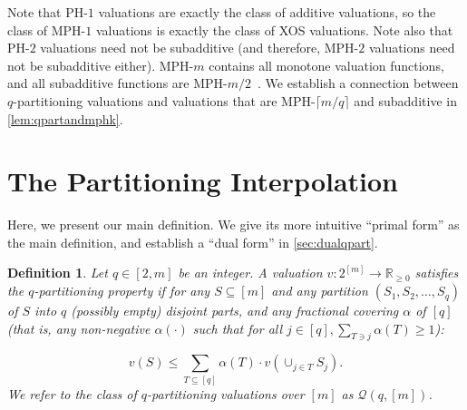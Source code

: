 \documentclass[11pt]{article}%
\newtheorem{definition}[theorem]{Definition}
\numberwithin{theorem}{subsection}
\begin{document}
Note that PH-$1$ valuations are exactly the class of additive valuations, so the class of MPH-$1$ valuations is exactly the class of XOS valuations. Note also that PH-$2$ valuations need not be subadditive (and therefore, MPH-$2$ valuations need not be subadditive either). MPH-$m$ contains all monotone valuation functions, and all subadditive functions are MPH-$m/2$~\cite{EzraFNTW19}. We establish a connection between $q$-partitioning valuations and valuations that are MPH-$\lceil m/q\rceil$ and subadditive in \cref{lem:qpartandmphk}.





\section{The Partitioning Interpolation}\label{sec:defineqpart}
Here, we present our main definition. We give its more intuitive ``primal form'' as the main definition, and establish a ``dual form'' in \cref{sec:dualqpart}.

\begin{definition}
\label{def:qpartprimal}
Let $q \in [2,m]$ be an integer. A valuation $v:2^{[m]}\longrightarrow \mathbb{R}_{\ge 0}$ satisfies the $q$-partitioning property if for any $S\subseteq [m]$ and any partition $(S_1, S_2, \ldots, S_q)$ of $S$ into $q$ (possibly empty) disjoint parts, and any fractional covering $\alpha$ of $[q]$ (that is, any non-negative $\alpha(\cdot)$ such that for all $j \in [q], \sum_{T \ni j} \alpha(T) \geq 1$):

$$v(S) \leq \sum_{T \subseteq [q]} \alpha(T) \cdot v\left(\cup_{j \in T} S_j\right).$$
We refer to the class of $q$-partitioning valuations over $[m]$ as $\mathcal{Q}(q,[m])$.

\end{definition}
\end{document}
